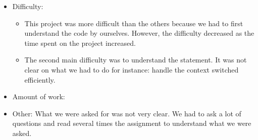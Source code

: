 \documentclass[a4paper, 10pt]{article}
\begin{document}
\begin{itemize}
    \item Difficulty: \begin{itemize}
        \item This project was more difficult than the others 
        because we had to first understand the code by ourselves. However, the difficulty decreased as the time spent on the project increased.
    
        \item The second main difficulty was to understand the statement. It was not clear on what we had to do for instance: handle the context switched efficiently.
    \end{itemize}
    \item Amount of work: %
    \item Other: What we were asked for was not very clear. We had to ask a lot of questions 
    and read several times the assignment to understand what we were asked.
\end{itemize}

 
\end{document}
